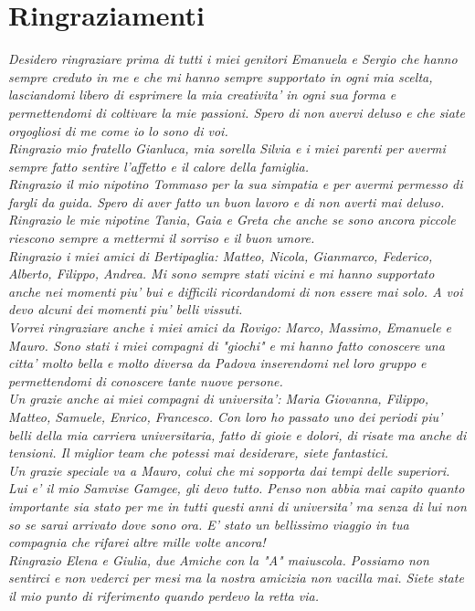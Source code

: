 \thispagestyle{empty}
\section{Ringraziamenti}
\textit{
Desidero ringraziare prima di tutti i miei genitori Emanuela e Sergio che hanno sempre creduto in me e che mi hanno sempre supportato in ogni mia scelta, lasciandomi libero di esprimere la mia creativita' in ogni sua forma e permettendomi di coltivare la mie passioni. Spero di non avervi deluso e che siate orgogliosi di me come io lo sono di voi.
\\
Ringrazio mio fratello Gianluca, mia sorella Silvia e i miei parenti per avermi sempre fatto sentire l'affetto e il calore della famiglia.
\\
Ringrazio il mio nipotino Tommaso per la sua simpatia e per avermi permesso di fargli da guida. Spero di aver fatto un buon lavoro e di non averti mai deluso. Ringrazio le mie nipotine Tania, Gaia e Greta che anche se sono ancora piccole riescono sempre a mettermi il sorriso e il buon umore.
\\
Ringrazio i miei amici di Bertipaglia: Matteo, Nicola, Gianmarco, Federico, Alberto, Filippo, Andrea. Mi sono sempre stati vicini e mi hanno supportato anche nei momenti piu' bui e difficili ricordandomi di non essere mai solo. A voi devo alcuni dei momenti piu' belli vissuti.
\\
Vorrei ringraziare anche i miei amici da Rovigo: Marco, Massimo, Emanuele e Mauro. Sono stati i miei compagni di "giochi" e mi hanno fatto conoscere una citta' molto bella e molto diversa da Padova inserendomi nel loro gruppo e permettendomi di conoscere tante nuove persone.
\\
Un grazie anche ai miei compagni di universita': Maria Giovanna, Filippo, Matteo, Samuele, Enrico, Francesco. Con loro ho passato uno dei periodi piu' belli della mia carriera universitaria, fatto di gioie e dolori, di risate ma anche di tensioni. Il miglior team che potessi mai desiderare, siete fantastici.
\\
Un grazie speciale va a Mauro, colui che mi sopporta dai tempi delle superiori. Lui e' il mio Samvise Gamgee, gli devo tutto. Penso non abbia mai capito quanto importante sia stato per me in tutti questi anni di universita' ma senza di lui non so se sarai arrivato dove sono ora. E' stato un bellissimo viaggio in tua compagnia che rifarei altre mille volte ancora!
\\
Ringrazio Elena e Giulia, due Amiche con la "A" maiuscola. Possiamo non sentirci e non vederci per mesi ma la nostra amicizia non vacilla mai. Siete state il mio punto di riferimento quando perdevo la retta via.
}
